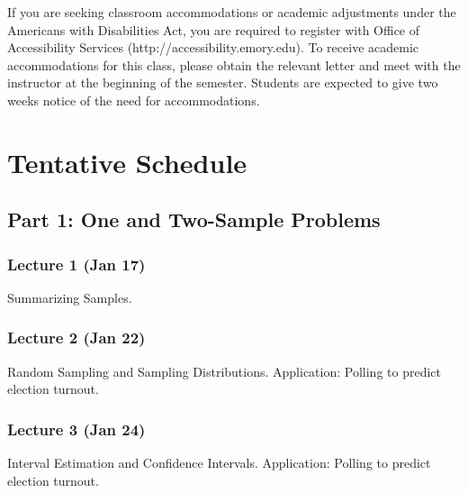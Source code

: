 \documentclass[12pt]{article}
\begin{document}
If you are seeking classroom accommodations or academic adjustments under the Americans with Disabilities Act, you are required to register with Office of Accessibility Services (http://accessibility.emory.edu). To receive academic accommodations for this class, please obtain the relevant letter and meet with the instructor at the beginning of the semester. Students are expected to give two weeks notice of the need for accommodations.

\bigskip
			\newpage 
\section*{Tentative Schedule}
\subsection*{Part 1: One and Two-Sample Problems}

\subsubsection*{Lecture 1 (Jan 17)}
Summarizing Samples.

\subsubsection*{Lecture 2 (Jan 22)}
Random Sampling and Sampling Distributions. Application: Polling to predict election turnout.

\subsubsection*{Lecture 3 (Jan 24)}
Interval Estimation and Confidence Intervals. Application: Polling to predict election turnout.
\end{document}
